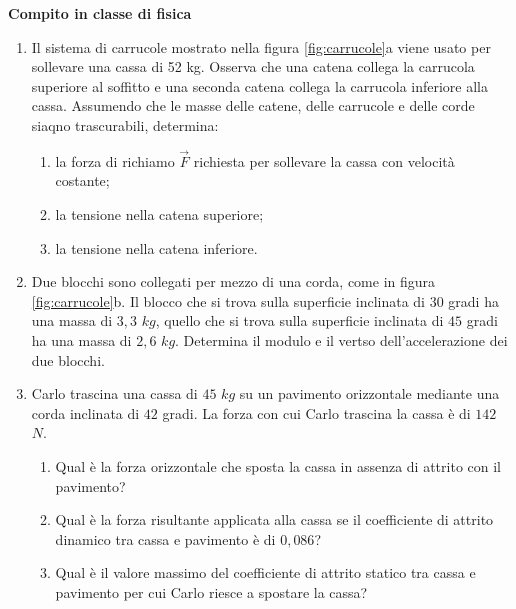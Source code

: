 \documentclass[14pt]{extarticle}
\begin{document}


\begin{center}
{\bf Compito in classe di fisica}
\end{center}


\begin{enumerate}

	\item Il sistema di carrucole mostrato nella figura \ref{fig:carrucole}a viene usato per sollevare una cassa di 52 kg. Osserva che una catena collega la carrucola superiore al soffitto e una seconda catena collega la carrucola inferiore alla cassa. Assumendo che le masse delle catene, delle carrucole e delle corde siaqno trascurabili, determina: 
		\begin{enumerate}
			\item la forza di richiamo $\vec{F}$ richiesta per sollevare la cassa con velocità costante;
			\item la tensione nella catena superiore;
			\item la tensione nella catena inferiore.
		\end{enumerate}
		
	\item Due blocchi sono collegati per mezzo di una corda, come in figura \ref{fig:carrucole}b. Il blocco che si trova sulla superficie inclinata di $30$ gradi ha una massa di $3,3$ $kg$, quello che si trova sulla superficie inclinata di $45$ gradi ha una massa di $2,6$ $kg$. Determina il modulo e il vertso dell'accelerazione dei due blocchi.
	
	\item Carlo trascina una cassa di $45$ $kg$ su un pavimento orizzontale mediante una corda inclinata di $42$ gradi. La forza con cui Carlo trascina la cassa è di $142$ $N$. 
	\begin{enumerate}
		\item Qual è la forza orizzontale che sposta la cassa in assenza di attrito con il pavimento?
		\item Qual è la forza risultante applicata alla cassa se il coefficiente di attrito dinamico tra cassa e pavimento è di $0,086$?
		\item Qual è il valore massimo del coefficiente di attrito statico tra cassa e pavimento per cui Carlo riesce a spostare la cassa?
	\end{enumerate}
\end{enumerate}
\end{document}
